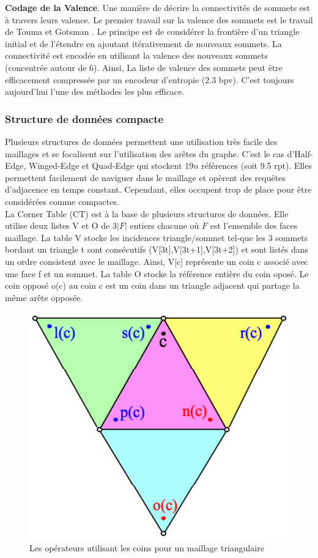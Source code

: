 \documentclass[a4paper,11pt,openany]{article}
\begin{document}
\noindent
\textbf{Codage de la Valence}. Une manière de décrire la connectivités de sommets est à travers leurs valence. Le premier travail sur la valence des sommets est le travail de Touma et Gotsman \cite{valence_encoding}. Le principe est de considérer la frontière d'un triangle initial et de l'étendre en ajoutant itérativement de nouveaux sommets. La connectivité est encodée en utilisant la valence des nouveaux sommets (concentrée autour de 6). Ainsi, La liste de valence des sommets peut être efficacement compressée par un encodeur d'entropie (2.3 bpv). C'est toujours aujourd'hui l'une des méthodes les plus efficace.
\subsubsection{Structure de données compacte}
\noindent
Plusieurs structures de données permettent une utilisation très facile des maillages et se focalisent sur l'utilisation des arêtes du graphe. C'est le cas d'Half-Edge, Winged-Edge \cite{winged_edge} et Quad-Edge \cite{quad_edge} qui stockent $19n$ références (soit 9.5 rpt). Elles permettent facilement de naviguer dans le maillage et opèrent des requêtes d'adjacence en temps constant. Cependant, elles occupent trop de place pour être considérées comme compactes.\\
La Corner Table (CT) est à la base de plusieurs structures de données. Elle utilise deux listes V et O de $3|F|$ entiers chacune où $F$ est l'ensemble des faces maillage. La table V stocke les incidences triangle/sommet tel-que les 3 sommets bordant un triangle t sont consécutifs (V[3t],V[3t+1],V[3t+2]) et sont listés dans un ordre consistent avec le maillage. Ainsi, V[c] représente un coin c associé avec une face f et un sommet. La table O stocke la référence entière du coin oposé. Le coin opposé o(c) au coin c est un coin dans un triangle adjacent qui partage la même arête opposée.
\begin{figure}[H]
\begin{center}
\includegraphics[scale=0.2]{Images/corner_table}
\caption{Les opérateurs utilisant les coins pour un maillage triangulaire}
\label{fig:corner_table}
\end{center}
\end{figure}
\end{document}
